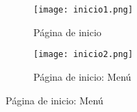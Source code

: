 \begin{figure}[H]
  \begin{subfigure}{0.5\textwidth}
    \centering
    \texttt{[image: inicio1.png]}
    \caption{Página de inicio}
    \label{fig:sub-first}
  \end{subfigure}
  \begin{subfigure}{0.5\textwidth}
    \centering
	  \texttt{[image: inicio2.png]}
    \caption{Página de inicio: Menú }
    \label{fig:sub-second}
  \end{subfigure}
\end{figure}



